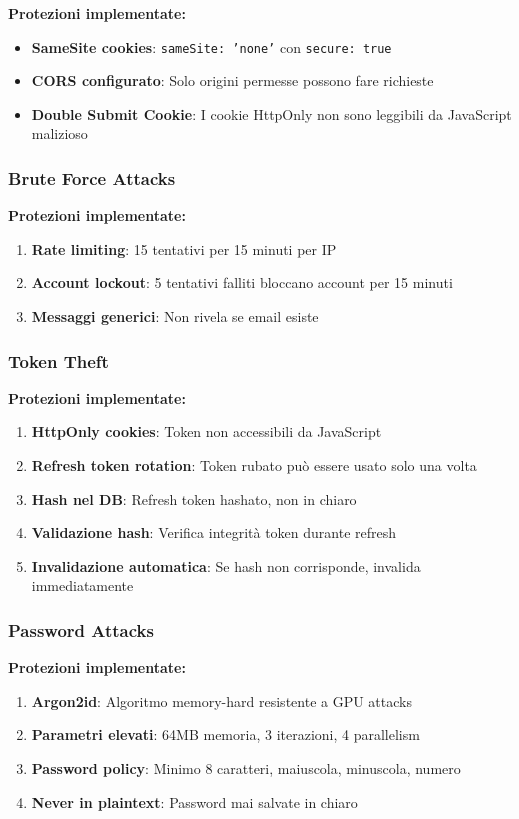 \documentclass[11pt,a4paper]{article}
\newcommand{\code}[1]{\texttt{#1}}
\begin{document}
\textbf{Protezioni implementate:}
\begin{itemize}
    \item \textbf{SameSite cookies}: \code{sameSite: 'none'} con \code{secure: true}
    \item \textbf{CORS configurato}: Solo origini permesse possono fare richieste
    \item \textbf{Double Submit Cookie}: I cookie HttpOnly non sono leggibili da JavaScript malizioso
\end{itemize}

\subsubsection{Brute Force Attacks}

\textbf{Protezioni implementate:}
\begin{enumerate}
    \item \textbf{Rate limiting}: 15 tentativi per 15 minuti per IP
    \item \textbf{Account lockout}: 5 tentativi falliti bloccano account per 15 minuti
    \item \textbf{Messaggi generici}: Non rivela se email esiste
\end{enumerate}

\subsubsection{Token Theft}

\textbf{Protezioni implementate:}
\begin{enumerate}
    \item \textbf{HttpOnly cookies}: Token non accessibili da JavaScript
    \item \textbf{Refresh token rotation}: Token rubato può essere usato solo una volta
    \item \textbf{Hash nel DB}: Refresh token hashato, non in chiaro
    \item \textbf{Validazione hash}: Verifica integrità token durante refresh
    \item \textbf{Invalidazione automatica}: Se hash non corrisponde, invalida immediatamente
\end{enumerate}

\subsubsection{Password Attacks}

\textbf{Protezioni implementate:}
\begin{enumerate}
    \item \textbf{Argon2id}: Algoritmo memory-hard resistente a GPU attacks
    \item \textbf{Parametri elevati}: 64MB memoria, 3 iterazioni, 4 parallelism
    \item \textbf{Password policy}: Minimo 8 caratteri, maiuscola, minuscola, numero
    \item \textbf{Never in plaintext}: Password mai salvate in chiaro
\end{enumerate}
\end{document}
